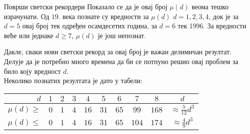 \begin{surferIntroPage}{Површи светски рекордери}
 Показало се да је овај број $\mu(d)$ веома тешко израчунати.
    Од $19$. века познате су вредности за $\mu(d)$  $d=1,2,3,4$, док је за  $d=5$
    овај број тек одређен осамдесетих година, за $d=6$ тек 1996.
    За вредности веће или једнаке $d\ge 7$, $\mu(d)$ је још непознат.
  
    Дакле, сваки нови светски рекорд за овај број је важан делимичан резултат. 
	Делује да је потребно много времена да би се потпуно решио овај проблем за било 
	коју вредност  $d$.\\  
	Неколико познатих резултата је дато у табели:
   \begin{center}
      \begin{tabular}{r|cccccccc|c}
        $d$ & $1$ & $2$ & $3$ & $4$ & $5$ & $6$ & $7$ & $8$ & $d$\\
        \hline
        \hline
        \rule{0pt}{1.2em}$\mu(d)\ge$ & $0$ & $1$ & $4$ & $16$ & $31$ & $65$ &
        $99$ & $168$ & 
        $\approx \frac{5}{12}d^3$\\[0.3em]
        \hline
        \rule{0pt}{1.2em}$\mu(d)\le$ & $0$ & $1$ & $4$ & $16$ & $31$ & $65$ &
        $104$ & $174$ & $\approx \frac{4}{9}d^3$
      \end{tabular}
    \end{center}
\end{surferIntroPage}
